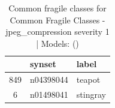 \begin{table}
\caption{Common fragile classes for Common Fragile Classes - jpeg_compression severity 1 | Models: ()}
\label{tab:Common Fragile Classes - jpeg_compression severity 1_d41d8cd9}
\begin{tabular}{cll}
\toprule
 & synset & label \\
\midrule
849 & n04398044 & teapot \\
6 & n01498041 & stingray \\
\bottomrule
\end{tabular}
\end{table}
